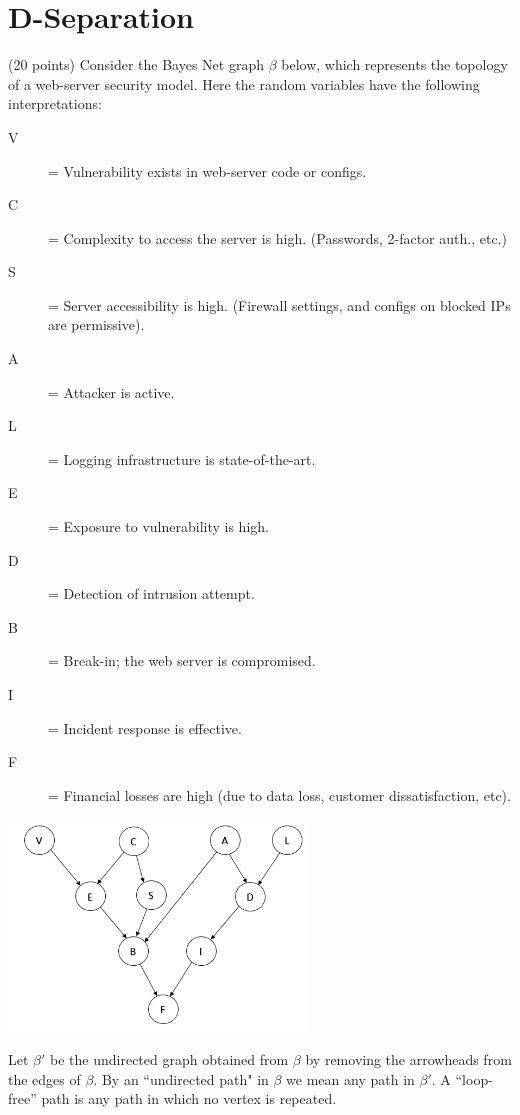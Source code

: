 \documentclass[12pt]{article}
\begin{document}
\section{D-Separation }
 (20 points)
Consider the Bayes Net graph $\beta$ below, which represents the topology of a web-server security model. Here the random variables have the following interpretations:
\begin{description}
  \item [V]  =  Vulnerability exists in web-server code or configs.
  \item [C] =  Complexity to access the server is high. (Passwords, 2-factor auth., etc.)
  \item [S] = Server accessibility is high.  (Firewall settings, and configs on blocked IPs are permissive).
  \item [A] = Attacker is active.
  \item [L] = Logging infrastructure is state-of-the-art.
  \item [E] = Exposure to vulnerability is high.
  \item [D] = Detection of intrusion attempt.
  \item [B] = Break-in; the web server is compromised.
  \item [I] = Incident response is effective.
  \item [F] = Financial losses are high (due to data loss, customer dissatisfaction, etc).
\end{description}

\begin{center}
  \includegraphics[width=0.6\textwidth]{D-Sep-Web-Server-Security.png}\end{center}
Let $\beta'$ be the undirected graph obtained from $\beta$ by removing the arrowheads from the edges of $\beta$.  By an ``undirected path" in $\beta$ we mean any path in $\beta'$. A ``loop-free'' path is any path in which no vertex is repeated.
\end{document}
